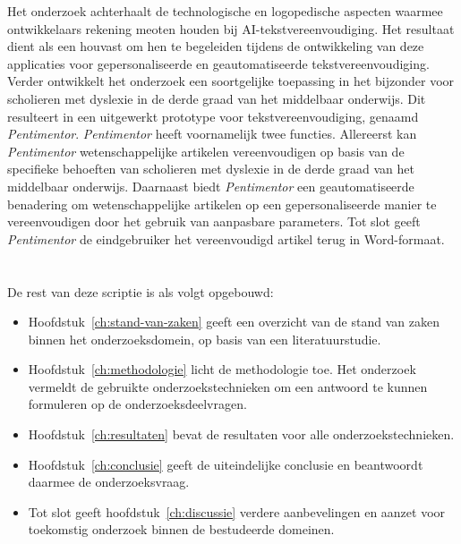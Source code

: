 Het onderzoek achterhaalt de technologische en logopedische aspecten waarmee ontwikkelaars rekening meoten houden bij AI-tekstvereenvoudiging. Het resultaat dient als een houvast om hen te begeleiden tijdens de ontwikkeling van deze applicaties voor gepersonaliseerde en geautomatiseerde tekstvereenvoudiging. Verder ontwikkelt het onderzoek een soortgelijke toepassing in het bijzonder voor scholieren met dyslexie in de derde graad van het middelbaar onderwijs. Dit resulteert in een uitgewerkt prototype voor tekstvereenvoudiging, genaamd \textit{Pentimentor}. \textit{Pentimentor} heeft voornamelijk twee functies. Allereerst kan \textit{Pentimentor} wetenschappelijke artikelen vereenvoudigen op basis van de specifieke behoeften van scholieren met dyslexie in de derde graad van het middelbaar onderwijs. Daarnaast biedt \textit{Pentimentor} een geautomatiseerde benadering om wetenschappelijke artikelen op een gepersonaliseerde manier te vereenvoudigen door het gebruik van aanpasbare parameters. Tot slot geeft \textit{Pentimentor} de eindgebruiker het vereenvoudigd artikel terug in Word-formaat. 

\section{}%
\label{sec:opzet-bachelorproef}

De rest van deze scriptie is als volgt opgebouwd:

\begin{itemize}
	\item Hoofdstuk~\ref{ch:stand-van-zaken} geeft een overzicht van de stand van zaken binnen het onderzoeksdomein, op basis van een literatuurstudie.
	\item Hoofdstuk~\ref{ch:methodologie} licht de methodologie toe. Het onderzoek vermeldt de gebruikte onderzoekstechnieken om een antwoord te kunnen formuleren op de onderzoeksdeelvragen. 
	\item Hoofdstuk~\ref{ch:resultaten} bevat de resultaten voor alle onderzoekstechnieken.
	\item Hoofdstuk~\ref{ch:conclusie} geeft de uiteindelijke conclusie en beantwoordt daarmee de onderzoeksvraag.
	\item Tot slot geeft hoofdstuk~\ref{ch:discussie} verdere aanbevelingen en aanzet voor toekomstig onderzoek binnen de bestudeerde domeinen. 
\end{itemize}
